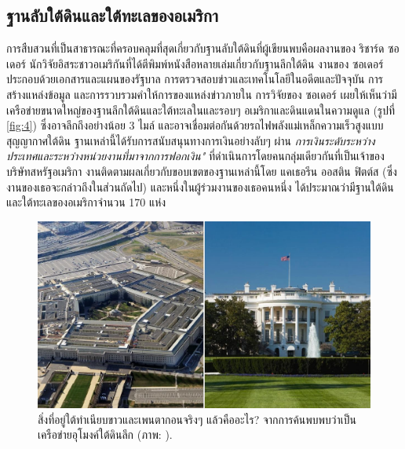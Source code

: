 \documentclass[10pt,twocolumn,letterpaper]{article}
\begin{document}
\subsection{ฐานลับใต้ดินและใต้ทะเลของอเมริกา}

การสืบสวนที่เป็นสาธารณะที่ครอบคลุมที่สุดเกี่ยวกับฐานลับใต้ดินที่ผู้เขียนพบคือผลงานของ ริชาร์ด ซอเดอร์ นักวิจัยอิสระชาวอเมริกันที่ได้ตีพิมพ์หนังสือหลายเล่มเกี่ยวกับฐานลึกใต้ดิน \cite{22} งานของ ซอเดอร์ ประกอบด้วยเอกสารและแผนของรัฐบาล การตรวจสอบข่าวและเทคโนโลยีในอดีตและปัจจุบัน การสร้างแหล่งข้อมูล และการรวบรวมคำให้การของแหล่งข่าวภายใน การวิจัยของ ซอเดอร์ เผยให้เห็นว่ามีเครือข่ายขนาดใหญ่ของฐานลึกใต้ดินและใต้ทะเลในและรอบๆ อเมริกาและดินแดนในความดูแล (รูปที่ \ref{fig:4}) ซึ่งอาจลึกถึงอย่างน้อย 3 ไมล์ และอาจเชื่อมต่อกันด้วยรถไฟพลังแม่เหล็กความเร็วสูงแบบสุญญากาศใต้ดิน ฐานเหล่านี้ได้รับการสนับสนุนทางการเงินอย่างลับๆ ผ่าน \textit{การเงินระดับระหว่างประเทศและระหว่างหน่วยงานที่มาจากการฟอกเงิน"} ที่ดำเนินการโดยคนกลุ่มเดียวกันที่เป็นเจ้าของบริษัทสหรัฐอเมริกา \cite{22} งานติดตามผลเกี่ยวกับขอบเขตของฐานเหล่านี้โดย แคเธอรีน ออสติน ฟิตต์ส (ซึ่งงานของเธอจะกล่าวถึงในส่วนถัดไป) และหนึ่งในผู้ร่วมงานของเธอคนหนึ่ง ได้ประมาณว่ามีฐานใต้ดินและใต้ทะเลของอเมริกาจำนวน 170 แห่ง \cite{16,20}

\begin{figure}[b]
\begin{center}
   \includegraphics[width=1\linewidth]{penta.jpg}
\end{center}
   \caption{สิ่งที่อยู่ใต้ทำเนียบขาวและเพนตากอนจริงๆ แล้วคืออะไร? จากการค้นพบพบว่าเป็นเครือข่ายอุโมงค์ใต้ดินลึก (ภาพ: \cite{31}).}
\label{fig:3}
\label{fig:onecol}
\end{figure}
\end{document}
